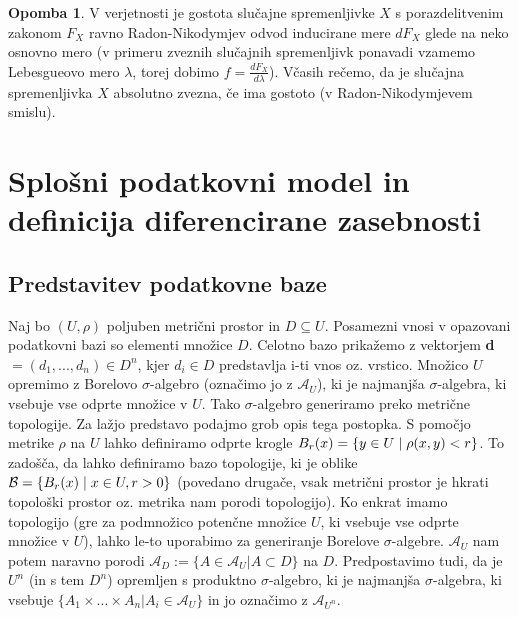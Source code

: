\documentclass[12pt,a4paper]{amsart}
\theoremstyle{definition} %
\newtheorem{opomba}[definicija]{Opomba}
\theoremstyle{plain} %
\begin{document}
\begin{opomba}
V verjetnosti je gostota slučajne spremenljivke $X$ s porazdelitvenim zakonom $F_X$ ravno Radon-Nikodymjev odvod inducirane mere $dF_X$ glede na neko osnovno mero (v primeru zveznih slučajnih spremenljivk ponavadi vzamemo Lebesgueovo mero $\lambda$, torej dobimo $f=\frac{dF_X}{d \lambda}$). Včasih rečemo, da je slučajna spremenljivka $X$ absolutno zvezna, če ima gostoto (v Radon-Nikodymjevem smislu).
\end{opomba}

\section{Splošni podatkovni model in definicija diferencirane zasebnosti}

\subsection{Predstavitev podatkovne baze}
Naj bo $(U, \rho)$ poljuben metrični prostor in $D \subseteq U$. Posamezni vnosi v opazovani podatkovni bazi so elementi množice $D$. Celotno bazo prikažemo z vektorjem \textbf{d} $= (d_{1}, ..., d_{n}) \in D^n$, kjer $d_{i} \in D$ predstavlja i-ti vnos oz. vrstico. 
\newline
\newline
Množico $U$ opremimo z Borelovo $\sigma$-algebro (označimo jo z $\mathcal{A}_{U}$), ki je najmanjša $\sigma$-algebra, ki vsebuje vse odprte množice v $U$. Tako $\sigma$-algebro generiramo preko metrične topologije. Za lažjo predstavo podajmo grob opis tega postopka. S pomočjo metrike $\rho$ na $U$ lahko definiramo odprte krogle  $B_{r}(x) = \{y \in U\hspace{0.1cm}|\hspace{0.1cm}\rho(x,y) < r\}$. To zadošča, da lahko definiramo bazo topologije, ki je oblike $\mathcal{B} = \{B_{r}(x)\hspace{0.1cm}|\hspace{0.1cm}x \in U, r>0\}$ (povedano drugače, vsak metrični prostor je hkrati topološki prostor oz. metrika nam porodi topologijo). Ko enkrat imamo topologijo  (gre za podmnožico potenčne množice $U$, ki vsebuje vse odprte množice v $U$), lahko le-to uporabimo za generiranje Borelove $\sigma$-algebre.
\newline
\newline
$\mathcal{A}_{U}$ nam potem naravno porodi $\mathcal{A}_{D} := \{A \in \mathcal{A}_{U} | A \subset D \}$ na $D$. Predpostavimo tudi, da je $U^n$ (in s tem $D^n$) opremljen s produktno $\sigma$-algebro, ki je najmanjša $\sigma$-algebra, ki vsebuje $\{A_{1} \times ... \times A_{n} | A_{i} \in \mathcal{A}_{U}\}$ in jo označimo z $\mathcal{A}_{U^n}$. 
\end{document}
